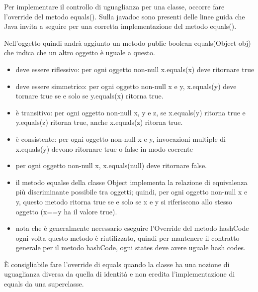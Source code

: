 \documentclass[a4paper,12pt,twoside]{book}
\begin{document}
Per implementare il controllo di uguaglianza per una classe, occorre
fare l'override del metodo equals().  Sulla javadoc sono presenti
delle linee guida che Java invita a seguire per una corretta
implementazione del metodo equals().

Nell'oggetto quindi andrà aggiunto un metodo public boolean
equals(Object obj) che indica che un altro oggetto è uguale a questo.
\begin{itemize}
\item deve essere riflessivo: per ogni oggetto non-null x.equals(x) deve
  ritornare true
\item deve essere simmetrico: per ogni oggetto non-null x e y,
  x.equals(y) deve tornare true se e solo se y.equals(x) ritorna true.
\item è transitivo: per ogni oggetto non-null x, y e z, se
  x.equals(y) ritorna true e y.equals(z) ritorna true, anche
  x.equals(z) ritorna true.
\item è consistente: per ogni oggetto non-null x e y,
  invocazioni multiple di x.equals(y) devono ritornare true o false in
  modo coerente
\item per ogni oggetto non-null x, x.equals(null) deve ritornare
  false.
\item il metodo equalse della classe Object implementa la relazione di
  equivalenza più discriminante possibile tra oggetti; quindi, per ogni
  oggetto non-null x e y, questo  metodo ritorna true se e solo se x e
  y si riferiscono allo stesso oggetto (x==y ha il valore true).
\item nota che è generalmente necessario eseguire l'Override del metodo
  hashCode ogni volta questo metodo è riutilizzato, quindi per
  mantenere il contratto generale per il metodo hashCode, ogni states
  deve avere uguale hash codes.
\end{itemize}

È consigliabile fare l'override di equals quando la classe ha una
nozione di uguaglianza diversa da quella di identità e non eredita
l'implementazione di equals da una superclasse.
\end{document}
